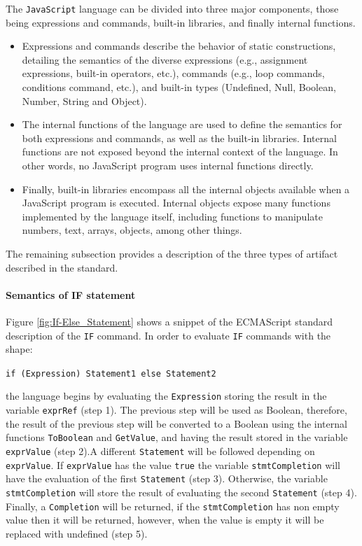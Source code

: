 \documentclass[runningheads]{llncs}
\begin{document}
The \texttt{JavaScript} language can be divided into three major components, those being expressions and commands, built-in libraries, and finally internal functions.
%
\begin{itemize}
\item Expressions and commands describe the behavior of static constructions, detailing the semantics of the diverse expressions (e.g., assignment expressions, built-in operators, etc.), commands (e.g., loop commands, conditions command, etc.), and built-in types (Undefined, Null, Boolean, Number, String and Object).
%
\item The internal functions of the language are used to define the semantics for both expressions and commands, as well as the built-in libraries. Internal functions are not exposed beyond the internal context of the language. In other words, no JavaScript program uses internal functions directly.
%
\item Finally, built-in libraries encompass all the internal objects available when a JavaScript program is executed. Internal objects expose many functions implemented by the language itself, including functions to manipulate numbers, text, arrays, objects, among other things.
\end{itemize}


The remaining subsection provides a description of the three types of artifact described in the standard.


\paragraph{Semantics of IF statement}
Figure \ref{fig:If-Else_Statement} shows a snippet of the ECMAScript standard description of the \texttt{IF} command. In order to evaluate \texttt{IF} commands with the shape:

\begin{center}
\texttt{if (Expression) Statement1 else Statement2}
\end{center}

\noindent the language begins by evaluating the \texttt{Expression} storing the result in the variable \texttt{exprRef} (step 1). The previous step will be used as Boolean, therefore, the result of the previous step will be converted to a Boolean using the internal functions \texttt{ToBoolean} and \texttt{GetValue}, and having the result stored in the variable \texttt{exprValue} (step 2).A different \texttt{Statement} will be followed depending on \texttt{exprValue}. If \texttt{exprValue} has the value \texttt{true} the variable \texttt{stmtCompletion} will have the evaluation of the first \texttt{Statement} (step 3). Otherwise, the variable \texttt{stmtCompletion} will store the result of evaluating the second \texttt{Statement} (step 4). Finally, a \texttt{Completion} will be returned, if the \texttt{stmtCompletion} has non empty value then it will be returned, however, when the value is empty it will be replaced with undefined (step 5).
\end{document}
